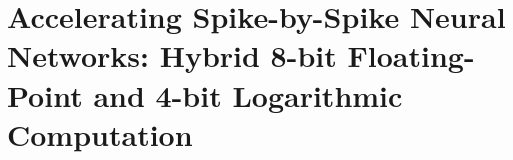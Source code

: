 \chapter{Accelerating Spike-by-Spike Neural Networks: Hybrid 8-bit Floating-Point and 4-bit Logarithmic Computation} \label{chap.sbs}
\minitoc

%


